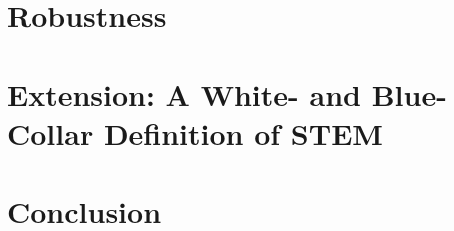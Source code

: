 \documentclass[a4paper, oneside, hyperfootnotes = false]{article}
\begin{document}
{\section{Robustness}
\label{robustness}


\section{Extension: A White- and Blue-Collar Definition of STEM}
\label{Extension}


\section{Conclusion}
\label{conclusion}

\vspace{4cm}

{}

\makeatletter %


\label{references}

\makeatother

\vspace{-.3cm}

\clearpage

}
\end{document}

